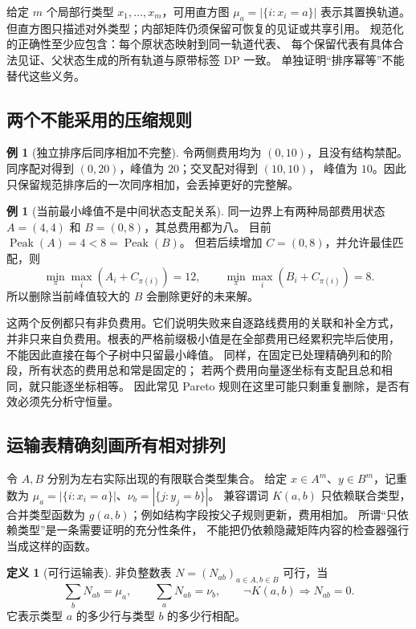 \documentclass[UTF8,a4paper,11pt,fontset=fandol]{ctexart}
\theoremstyle{definition}
\newtheorem{definition}[theorem]{定义}
\newtheorem{example}[theorem]{例}
\newcommand{\Peak}{\operatorname{Peak}}
\begin{document}
给定 $m$ 个局部行类型 $x_1,\ldots,x_m$，可用直方图
$\mu_a=|\{i:x_i=a\}|$ 表示其置换轨道。
但直方图只描述对外类型；内部矩阵仍须保留可恢复的见证或共享引用。
规范化的正确性至少应包含：每个原状态映射到同一轨道代表、
每个保留代表有具体合法见证、父状态生成的所有轨道与原带标签 DP 一致。
单独证明“排序幂等”不能替代这些义务。

\subsection{两个不能采用的压缩规则}

\begin{example}[独立排序后同序相加不完整]\label{ex:sort}
令两侧费用均为 $(0,10)$，且没有结构禁配。
同序配对得到 $(0,20)$，峰值为 $20$；交叉配对得到 $(10,10)$，
峰值为 $10$。因此只保留规范排序后的一次同序相加，会丢掉更好的完整解。
\end{example}

\begin{example}[当前最小峰值不是中间状态支配关系]\label{ex:peak}
同一边界上有两种局部费用状态
$A=(4,4)$ 和 $B=(0,8)$，其总费用都为八。
目前 $\Peak(A)=4<8=\Peak(B)$。
但若后续增加 $C=(0,8)$，并允许最佳匹配，则
\[
\min_{\pi}\max_i(A_i+C_{\pi(i)})=12,\qquad
\min_{\pi}\max_i(B_i+C_{\pi(i)})=8.
\]
所以删除当前峰值较大的 $B$ 会删除更好的未来解。
\end{example}

这两个反例都只有非负费用。它们说明失败来自逐路线费用的关联和补全方式，
并非只来自负费用。根表的严格前缀极小值是在全部费用已经累积完毕后使用，
不能因此直接在每个子树中只留最小峰值。
同样，在固定已处理精确列和的阶段，所有状态的费用总和常是固定的；
若两个费用向量逐坐标有支配且总和相同，就只能逐坐标相等。
因此常见 Pareto 规则在这里可能只剩重复删除，是否有效必须先分析守恒量。

\subsection{运输表精确刻画所有相对排列}

令 $A,B$ 分别为左右实际出现的有限联合类型集合。
给定 $x\in A^m$、$y\in B^m$，记重数为
$\mu_a=|\{i:x_i=a\}|$、$\nu_b=|\{j:y_j=b\}|$。
兼容谓词 $K(a,b)$ 只依赖联合类型，
合并类型函数为 $g(a,b)$；例如结构字段按父子规则更新，费用相加。
所谓“只依赖类型”是一条需要证明的充分性条件，
不能把仍依赖隐藏矩阵内容的检查器强行当成这样的函数。

\begin{definition}[可行运输表]
非负整数表 $N=(N_{ab})_{a\in A,b\in B}$ 可行，当
\begin{equation}\label{eq:transport}
\sum_bN_{ab}=\mu_a,\qquad
\sum_aN_{ab}=\nu_b,\qquad
\neg K(a,b)\Longrightarrow N_{ab}=0.
\end{equation}
它表示类型 $a$ 的多少行与类型 $b$ 的多少行相配。
\end{definition}
\end{document}
